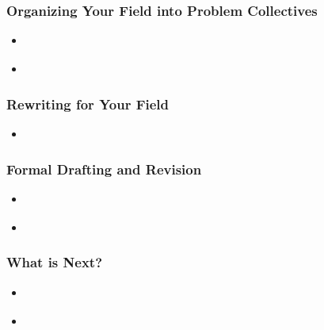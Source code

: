 \documentclass[11pt]{article}
\begin{document}
\subsubsection{Organizing Your Field into Problem Collectives}
\begin{itemize}
\item \begin{exercise}
\end{exercise}

\item  \begin{exercise}
\end{exercise} 
\end{itemize}
\subsubsection{Rewriting for Your Field}
\begin{itemize}
\item \begin{exercise}
\end{exercise} 
\end{itemize}
\subsubsection{Formal Drafting and Revision}
\begin{itemize}
\item \begin{exercise}
\end{exercise}

\item \begin{exercise}
\end{exercise}
\end{itemize}
\subsubsection{What is Next?}
\begin{itemize}
\item \begin{exercise}
\end{exercise}

\item \begin{exercise}
\end{exercise}
\end{itemize}
\end{document}

